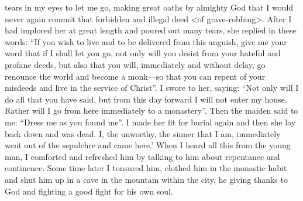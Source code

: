tears in my eyes to let me go, making great oaths by almighty God
that I would never again commit that forbidden and illegal deed <of
grave-robbing>.
After I had implored her at great length and
poured out many tears, she replied in these words: “If you wish to
live and to be delivered from this anguish, give me your word that
if I shall let you go, not only will you desist from your hateful and
profane deeds, but also that you will, immediately and without
delay, go renounce the world and become a monk—so that you can
repent of your misdeeds and live in the service of Christ”.
I swore
to her, saying: “Not only will I do all that you have said, but from
this day forward I will not enter my house.
Rather will I go from
here immediately to a monastery”.
Then the maiden said to me:
“Dress me as you found me”.
I made her fit for burial again and
then she lay back down and was dead.
I, the unworthy, the sinner
that I am, immediately went out of the sepulchre and came here.'
When I heard all this from the young man, I comforted and
refreshed him by talking to him about repentance and continence.
Some time later I tonsured him, clothed him in the monastic habit
and shut him up in a cave in the mountain within the city, he giving
thanks to God and fighting a good fight for his own soul.

